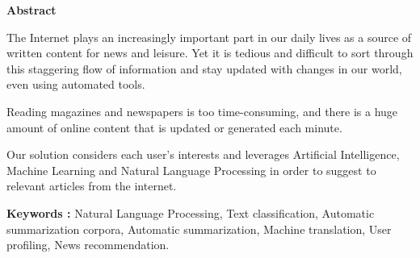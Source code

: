 \begin{center}
    \Large 
    \textbf{Abstract}
\end{center}

The Internet plays an increasingly important part in our daily lives as a source of written content for news and leisure. Yet it is tedious and difficult to sort through this staggering flow of information and stay updated with changes in our world, even using automated tools. 

Reading magazines and newspapers is too time-consuming, and there is a huge amount of online content that is updated or generated each minute. 

Our solution considers each user's interests and leverages Artificial Intelligence, Machine Learning and Natural Language Processing in order to suggest to relevant articles from the internet.

\noindent
\textbf{Keywords :} Natural Language Processing, Text classification, Automatic summarization corpora, Automatic summarization, Machine translation, User profiling, News recommendation. 